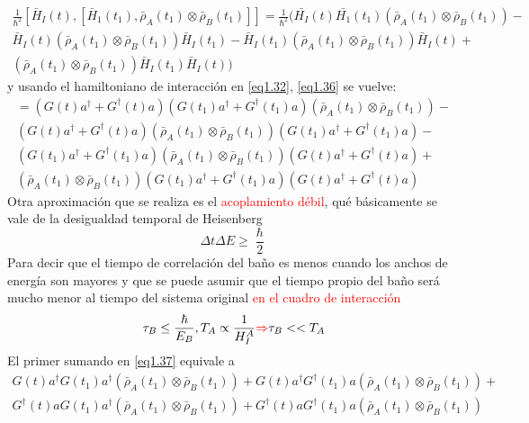 \documentclass{book}
\begin{document}
\begin{equation}\label{eq1.36}\begin{aligned}\frac{1}{\hslash^2}[\bar{H}_I(t),[\bar{H}_1(t_1),\bar{\rho}_A(t_1)\otimes\bar{\rho}_B(t_1)]]=\frac{1}{\hslash^2}(\bar{H_I}(t)\bar{H_1}(t_1)(\bar{\rho}_A(t_1)\otimes\bar{\rho}_B(t_1))-\\  \bar{H}_I(t)(\bar{\rho}_A(t_1)\otimes\bar{\rho}_B(t_1))\bar{H}_I(t_1) -\bar{H}_I(t_1)(\bar{\rho}_A(t_1)\otimes\bar{\rho}_B(t_1))\bar{H}_I(t)+ \\ (\bar{\rho}_A(t_1)\otimes\bar{\rho}_B(t_1))\bar{H}_I(t_1)\bar{H}_I(t))\end{aligned}\end{equation}
 y usando el hamiltoniano de interacción en \textcolor{blue}{\ref{eq1.32}}, \textcolor{blue}{\ref{eq1.36}} se vuelve:
 \begin{equation}\begin{aligned} \label{eq1.37} { =(G(t)a^\dag+G^\dag(t)a)(G(t_1)a^\dag+G^\dag(t_1)a)(\bar{\rho}_A(t_1)\otimes\bar{\rho}_B(t_1))-} \\ {(G(t)a^\dag+G^\dag(t)a)(\bar{\rho}_A(t_1)\otimes\bar{\rho}_B(t_1))(G(t_1)a^\dag+G^\dag(t_1)a)-} \\ {(G(t_1)a^\dag+G^\dag(t_1)a)(\bar{\rho}_A(t_1)\otimes\bar{\rho}_B(t_1))(G(t)a^\dag+G^\dag(t)a)+} \\ {(\bar{\rho}_A(t_1)\otimes\bar{\rho}_B(t_1))(G(t_1)a^\dag+G^\dag(t_1)a)(G(t)a^\dag+G^\dag(t)a)} \end{aligned}\end{equation}
 Otra aproximación que se realiza es el \textcolor{Red}{acoplamiento débil}, qué básicamente se vale de la desigualdad temporal de Heisenberg
 \begin{equation}\label{eq1.38} {\Delta t \Delta E \geq \frac{\hslash}{2}}\end{equation}
 Para decir que el tiempo de correlación del baño es menos cuando los anchos de energía son mayores y que se puede asumir que el tiempo propio del baño será mucho menor al tiempo del sistema original \textcolor{Red}{en el cuadro de interacción}
 \begin{equation}\label{eq1.39} {\tau_B \leq \frac{\hslash}{E_B}, T_A\propto \frac{1}{H^A_I}\textcolor{red}{\Rightarrow} \tau_B << T_A}\end{equation}
 El primer sumando en \textcolor{blue}{\ref{eq1.37}} equivale a
 \begin{equation}\begin{aligned}\label{eq1.40} {G(t)a^\dag G(t_1)a^\dag(\bar{\rho}_A(t_1)\otimes\bar{\rho}_B(t_1))+ G(t)a^\dag G^\dag(t_1)a(\bar{\rho}_A(t_1)\otimes\bar{\rho}_B(t_1))+} \\ {G^\dag(t)a G(t_1)a^\dag(\bar{\rho}_A(t_1)\otimes\bar{\rho}_B(t_1))+ G^\dag(t)a G^\dag(t_1) a(\bar{\rho}_A(t_1)\otimes\bar{\rho}_B(t_1))}\end{aligned}\end{equation}
\end{document}
